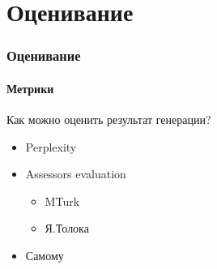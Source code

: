 \documentclass[10pt]{beamer}
\begin{document}
\section{Оценивание}
\begin{frame}
\frametitle{Оценивание}
\framesubtitle{Метрики}

Как можно оценить результат генерации?
\begin{itemize}
    \item Perplexity
    \item Assessors evaluation
        \begin{itemize}
            \item MTurk
            \item Я.Толока
        \end{itemize}
    \item Самому
\end{itemize}



\end{frame}
\end{document}
